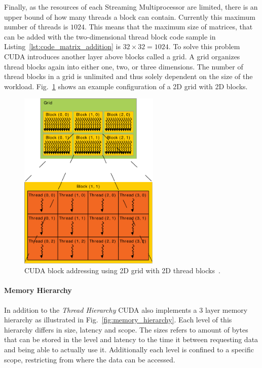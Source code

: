 Finally, as the resources of each Streaming Multiprocessor are limited, there is an upper bound of how many threads a block can contain. Currently this maximum number of threads is $1024$. This means that the maximum size of matrices, that can be added with the two-dimensional thread block code sample in Listing~\ref{lst:code_matrix_addition} is $32\times32 = 1024$. To solve this problem CUDA introduces another layer above blocks called a grid. A grid organizes thread blocks again into either one, two, or three dimensions. The number of thread blocks in a grid is unlimited and thus solely dependent on the size of the workload. Fig.~\ref{fig:grid_blocks} shows an example configuration of a 2D grid with 2D blocks.

\begin{figure}[!htbp]
  \centering
  \includegraphics[width=0.6\textwidth]{img/grid_blocks.pdf}
  \caption[CUDA block addressing using 2D grid with 2D thread blocks.]{CUDA block addressing using 2D grid with 2D thread blocks~\cite{CudaProgrammingGuide}.}
  \label{fig:grid_blocks}
\end{figure}

\paragraph{Memory Hierarchy}

In addition to the \emph{Thread Hierarchy} CUDA also implements a 3 layer memory hierarchy as illustrated in Fig.~\ref{fig:memory_hierarchy}. Each level of this hierarchy differs in size, latency and scope. The sizes refers to amount of bytes that can be stored in the level and latency to the time it between requesting data and being able to actually use it. Additionally each level is confined to a specific scope, restricting from where the data can be accessed.

